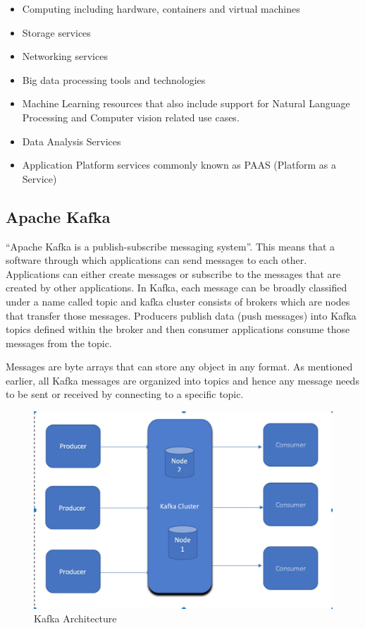\begin{itemize}
	\item Computing including hardware, containers and virtual machines
	\item Storage services
	\item Networking services
	\item Big data processing tools and technologies
	\item Machine Learning resources that also include support for
    Natural Language Processing and Computer vision related use cases.
	\item Data Analysis Services
	\item Application Platform services commonly known as PAAS (Platform
    as a Service)
\end{itemize}

\subsection{Apache Kafka}

``Apache Kafka is a publish-subscribe messaging
system''\cite{hid-sp18-510-kafka}. This means that a software through
which applications can send messages to each other. Applications can
either create messages or subscribe to the messages that are created
by other applications.  In Kafka, each message can be broadly
classified under a name called topic and kafka cluster consists of
brokers which are nodes that transfer those messages. Producers
publish data (push messages) into Kafka topics defined within the
broker and then consumer applications consume those messages from the
topic.

Messages are byte arrays that can store any object in any format. As
mentioned earlier, all Kafka messages are organized into topics and
hence any message needs to be sent or received by connecting to a
specific topic.

\begin{figure}[htbp] 
	\centering
	\includegraphics[width=\columnwidth]{images/kafkaarchitecture.jpg}
	\caption{Kafka Architecture}
\label{fig:kafkaarchitecture} 
\end{figure}

